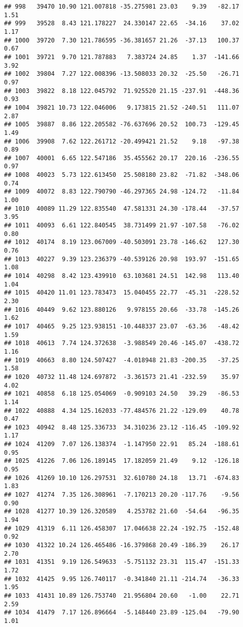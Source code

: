 \documentclass[]{article}
\begin{document}
\begin{verbatim}
## 998   39470 10.90 121.007818 -35.275981 23.03    9.39   -82.17  1.51
## 999   39528  8.43 121.178227  24.330147 22.65  -34.16    37.02  1.17
## 1000  39720  7.30 121.786595 -36.381657 21.26  -37.13   100.37  0.67
## 1001  39721  9.70 121.787883   7.383724 24.85    1.37  -141.66  3.92
## 1002  39804  7.27 122.008396 -13.508033 20.32  -25.50   -26.71  0.97
## 1003  39822  8.18 122.045792  71.925520 21.15 -237.91  -448.36  0.93
## 1004  39821 10.73 122.046006   9.173815 21.52 -240.51   111.07  2.87
## 1005  39887  8.86 122.205582 -76.637696 20.52  100.73  -129.45  1.49
## 1006  39908  7.62 122.261712 -20.499421 21.52    9.18   -97.38  0.89
## 1007  40001  6.65 122.547186  35.455562 20.17  220.16  -236.55  0.97
## 1008  40023  5.73 122.613450  25.508180 23.82  -71.82  -348.06  0.74
## 1009  40072  8.83 122.790790 -46.297365 24.98 -124.72   -11.84  1.00
## 1010  40089 11.29 122.835540  47.581331 24.30 -178.44   -37.57  3.95
## 1011  40093  6.61 122.840545  38.731499 21.97 -107.58   -76.02  0.80
## 1012  40174  8.19 123.067009 -40.503091 23.78 -146.62   127.30  0.76
## 1013  40227  9.39 123.236379 -40.539126 20.98  193.97  -151.65  1.08
## 1014  40298  8.42 123.439910  63.103681 24.51  142.98   113.40  1.04
## 1015  40420 11.01 123.783473  15.040455 22.77  -45.31  -228.52  2.30
## 1016  40449  9.62 123.880126   9.978155 20.66  -33.78  -145.26  1.62
## 1017  40465  9.25 123.938151 -10.448337 23.07  -63.36   -48.42  1.59
## 1018  40613  7.74 124.372638  -3.988549 20.46 -145.07  -438.72  1.16
## 1019  40663  8.80 124.507427  -4.018948 21.83 -200.35   -37.25  1.58
## 1020  40732 11.48 124.697872  -3.361573 21.41 -232.59    35.97  4.02
## 1021  40858  6.18 125.054069  -0.909103 24.50   39.29   -86.53  1.14
## 1022  40888  4.34 125.162033 -77.484576 21.22 -129.09    40.78  0.47
## 1023  40942  8.48 125.336733  34.310236 23.12 -116.45  -109.92  1.17
## 1024  41209  7.07 126.138374  -1.147950 22.91   85.24  -188.61  0.95
## 1025  41226  7.06 126.189145  17.182059 21.49    9.12  -126.18  0.95
## 1026  41269 10.10 126.297531  32.610780 24.18   13.71  -674.83  1.83
## 1027  41274  7.35 126.308961  -7.170213 20.20 -117.76    -9.56  0.90
## 1028  41277 10.39 126.320589   4.253782 21.60  -54.64   -96.35  1.94
## 1029  41319  6.11 126.458307  17.046638 22.24 -192.75  -152.48  0.92
## 1030  41322 10.24 126.465486 -16.379868 20.49 -186.39    26.17  2.70
## 1031  41351  9.19 126.549633  -5.751132 23.31  115.47  -151.33  1.72
## 1032  41425  9.95 126.740117  -0.341840 21.11 -214.74   -36.33  1.95
## 1033  41431 10.89 126.753740  21.956804 20.60   -1.00    22.71  2.59
## 1034  41479  7.17 126.896664  -5.148440 23.89 -125.04   -79.90  1.01

\end{verbatim}
\end{document}
